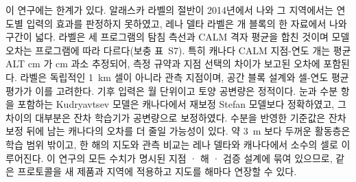 이 연구에는 한계가 있다. 알래스카 라벨의 절반이 2014년에서 나와 그 지역에서는 연도별 입력의 효과를 판정하지 못하였고, 레나 델타 라벨은 \nnblkLe{}개 블록의 한 자료에서 나와 구간이 넓다. 라벨은 세 프로그램의 탐침 측선과 CALM 격자 평균을 합친 것이며 모델 오차는 프로그램에 따라 다르다(보충 표~S7). 특히 캐나다 CALM 지점-연도 \nsrcCaCALMN{}개는 평균 ALT \nsrcCaCALMObs{} cm 가 \nsrcCaCALMBias{} cm 과소 추정되어, 측정 규약과 지점 선택의 차이가 보고된 오차에 포함된다. 라벨은 독립적인 1~km 셀이 아니라 관측 지점이며, 공간 블록 설계와 셀-연도 평균 평가가 이를 고려한다. 기후 입력은 월 단위이고 토양 공변량은 정적이다. 눈과 수분 항을 포함하는 Kudryavtsev 모델은 캐나다에서 재보정 Stefan 모델보다 정확하였고, 그 차이의 대부분은 잔차 학습기가 공변량으로 보정하였다. 수분을 반영한 기준값은 잔차 보정 뒤에 남는 캐나다의 오차를 더 줄일 가능성이 있다. 약 3~m 보다 두꺼운 활동층은 학습 범위 밖이고, 한 해의 지도와 관측 비교는 레나 델타와 캐나다에서 소수의 셀로 이루어진다. 이 연구의 모든 수치가 명시된 지점 · 해 · 검증 설계에 묶여 있으므로, 같은 프로토콜을 새 제품과 지역에 적용하고 지도를 해마다 연장할 수 있다.
